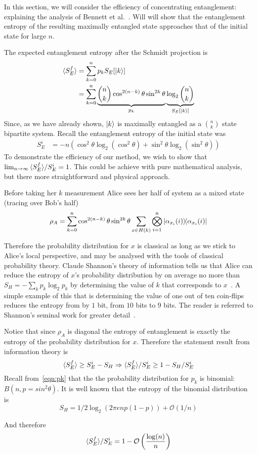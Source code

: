 In this section, we will consider the efficiency of concentrating entanglement: explaining the analysis of Bennett et al.~\cite{bennett1996concentrating}.
Will will show that the entanglement entropy of the resulting maximally entangled state approaches that of the initial state for large $n$.

The expected entanglement entropy after the Schmidt projection is
\begin{align*}
{\langle S_E^f \rangle} &= \sum_{k=0}^n p_k S_E[\ket{k}] \\
&=\sum_{k=0}^n \underbrace{\binom{n}{k} \cos^{2(n-k)}\theta \sin^{2k}\theta}_{p_k}
 \underbrace{\log_2 \binom{n}{k}}_{S_E[\ket{k}]}
\end{align*}
Since, as we have already shown, $\ket{k}$ is maximally entangled as a $\binom{n}{k}$ state bipartite system.
Recall the entanglement entropy of the initial state was
\begin{align*}
S_{E}^i &= -n \left( \cos^2\theta \log_2 \left(\cos^2\theta \right)
+ \sin^2\theta \log_2 \left(\sin^2\theta \right)\right)
\end{align*}
To demonstrate the efficiency of our method, we wish to show that \\$\lim_{n \rightarrow \infty}  {\langle S_E^f \rangle} / S_E^i  = 1$.
This could be achieve with pure mathematical analysis, but there more straightforward and physical approach.

Before taking her $k$ measurement Alice sees her half of system as a mixed state (tracing over Bob's half)
\begin{align*}
\rho_A = \sum_{k=0}^n \cos^{2(n-k)}\theta \sin^{2k}\theta
\sum_{x \in H(k)} \bigotimes_{i=1}^n 
\dyad{\alpha_{x_i}(i)}{\alpha_{x_i}(i)}
\end{align*}

Therefore the probability distribution for $x$ is classical as long as we stick to Alice's local perspective, and may be analysed with the tools of classical probability theory.
Claude Shannon's theory of information tells us that Alice can reduce the entropy of $x$'s probability distribution  by on average no more than $S_H = - \sum_k p_k \log_2 p_k$ by determining the value of $k$ that corresponds to $x$~\cite{shannon2001communication}. A simple example of this that is determining the value of one out of ten coin-flips reduces the entropy from by $1$ bit, from $10$ bits to $9$ bits. The reader is referred to Shannon's seminal work for greater detail~\cite{shannon2001communication}.

Notice that since $\rho_A$ is diagonal the entropy of entanglement is exactly the entropy of the probability distribution for $x$.
Therefore the statement result from information theory is
$$
{\langle S_E^f \rangle} \ge S_E^i - S_H \Rightarrow {\langle S_E^f \rangle} / S_E^i \ge 1 - S_H /S_E^i 
$$
Recall from~\eqref{eqn:pk} that the the probability distribution for $p_k$ is binomial: $B(n, p=sin^2\theta)$.
It is well known that the entropy of the binomial distribution is
$$S_H = 1/2 \log_2 \left(2 \pi e n p (1-p)\right) + \mathcal{O}(1/n)$$

And therefore 
$$
{\langle S_E^f \rangle} / S_E^i = 1 - \mathcal{O}\left(\frac{\log(n)}{n}\right)
$$


